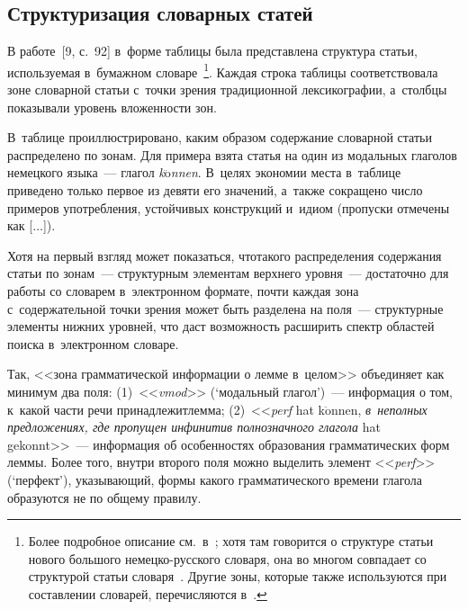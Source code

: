\begin{multicols}{2}
\vspace*{-6pt}
  
\section{Структуризация словарных статей}

\vspace*{-3pt}

  В работе~[9, с.~92] в~форме таблицы была пред\-став\-ле\-на структура статьи, 
используемая в~бумажном словаре~\cite{5-gz}\footnote{Более подробное описание 
см.\ в~\cite[с.~40--44]{10-gz}; хотя там говорится о структуре статьи нового большого 
не\-мец\-ко-рус\-ско\-го словаря, она во многом совпадает со структурой статьи словаря~\cite{5-gz}. 
Другие зоны, 
которые также используются при составлении словарей, перечисляются в~\cite{11-gz}.}. 
Каждая строка таблицы соответствовала зоне словарной статьи с~точки 
зрения традици\-он\-ной лексикографии, а~столбцы показывали уровень 
вложенности зон. 

В~таб\-ли\-це проиллюстрировано, каким образом 
содержание словарной статьи распределено по зонам. Для примера взята 
статья на один из модальных глаголов немецкого языка~--- глагол 
\textit{k$\ddot{\mbox{o}}$nnen}. В~целях экономии места в~таблице 
приведено только первое из девяти его значений, 
а~также сокращено чис\-ло примеров употребления, устойчивых конструкций и~идиом
(пропуски отмечены как 
[$\ldots$]).
  



  Хотя на первый взгляд может показаться, что\linebreak такого распределения 
содержания статьи по зонам~--- структурным элементам верхнего уровня~--- 
достаточно для работы со словарем в~\mbox{электронном} формате, почти каждая 
зона с~содержательной точки зрения может быть разделена на поля~--- 
структурные элементы нижних уровней, что даст возможность расширить 
спектр областей поиска в~электронном словаре.
  
  Так, <<зона грамматической информации о лемме в~целом>> объединяет 
как минимум два поля: (1)~<<\textit{vmod}>> (`модальный глагол')~--- 
информация о том, к~какой части речи принадлежит\linebreak лемма; (2)~<<\textit{perf} hat 
k$\ddot{\mbox{o}}$nnen, \textit{в~неполных предложениях, где пропущен 
инфинитив полнозначного глагола} hat gekonnt>>~--- информация об 
особенностях образования грамматических форм леммы. Более того, внут\-ри 
второго поля можно выделить элемент <<\textit{perf}>> (`перфект'), 
ука\-зы\-ва\-ющий, формы какого грамматического времени глагола образуются 
не по общему правилу. 
  

\end{multicols}
